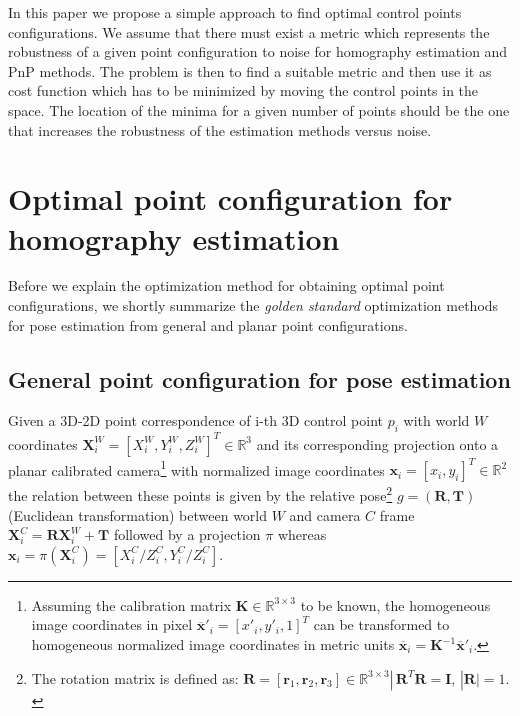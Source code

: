 \documentclass[letterpaper, 10 pt, conference]{ieeeconf}  %
\begin{document}
In this paper we propose a simple approach to find optimal control points configurations. We assume that there must exist a metric which represents the robustness of a given point configuration to noise for homography estimation and PnP methods. The problem is then to find a suitable metric and then use it as cost function which has to be minimized by moving the control points in the space. The location of the minima for a given number of points should be the one that increases the robustness of the estimation methods versus noise.


\section{Optimal point configuration for homography estimation}
\label{IdeaPointConfigSearch}

Before we explain the optimization method for obtaining optimal point configurations, we shortly summarize the \textit{golden standard} optimization methods for
pose estimation from general and planar point configurations. 

\subsection{General point configuration for pose estimation}

Given a 3D-2D point correspondence of i-th 3D control point $p_i$ with world $W$ coordinates 
$\mathbf{X}_i^{W} = [X_i^{W}, Y_i^{W}, Z_i^{W}]^T \in \mathbb{R}^3$ and its corresponding projection onto a planar calibrated camera\footnote{Assuming the calibration matrix $\mathbf{K} \in \mathbb{R}^{3\times 3}$ to be known, the homogeneous image coordinates in pixel 
$\overline{\mathbf{x}}'_i = [x'_i, y'_i, 1]^T$ can be transformed to homogeneous normalized image coordinates in metric units 
$\overline{\mathbf{x}}_i = \mathbf{K}^{-1}\overline{\mathbf{x}}'_i$.} with normalized image coordinates $\mathbf{x}_i = [x_i, y_i]^T \in \mathbb{R}^2$ the relation between these points is given by the relative pose\footnote{The rotation matrix is defined as: $\mathbf{R} = [\mathbf{r}_1, \mathbf{r}_2, \mathbf{r}_3] \in \mathbb{R}^{3 \times 3} |\,  \mathbf{R}^T\mathbf{R} = \mathbf{I},\, |\mathbf{R}|=1.$ } 
$g = (\mathbf{R}, \mathbf{T})$ (Euclidean transformation) between world $W$ and camera $C$ frame $\mathbf{X}_i^{C} = \mathbf{R}\mathbf{X}_i^{W}+\mathbf{T}$
followed by a projection $\pi$ whereas $\mathbf{x}_i = \pi(\mathbf{X}_i^{C}) = [X_i^{C}/Z_i^{C}, Y_i^{C}/Z_i^{C}]$.
\end{document}
